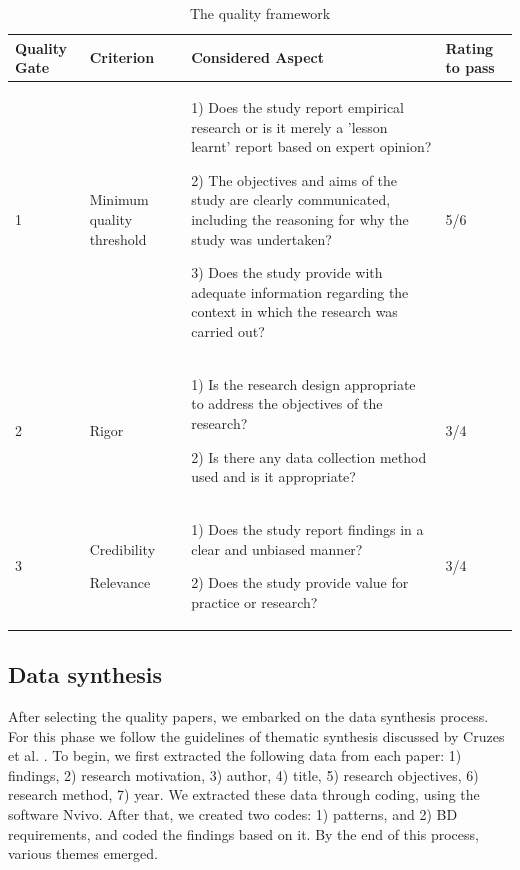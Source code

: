 \documentclass[a4paper,11pt,article,oneside]{memoir}
\begin{document}
\begin{table}
    \renewcommand{\arraystretch}{1}
    \caption[]{The quality framework}
    \begin{tabular}{|p{1cm}|p{2cm}|p{10cm}|p{1.5cm}|}
        \hline
        Quality Gate & Criterion & Considered Aspect & Rating to pass \\ 

        \hline

        1 & Minimum quality threshold & 
        
        1) Does the study report empirical research or is it merely a 'lesson learnt' report based on expert opinion?

        2) The objectives and aims of the study are clearly communicated, including the reasoning for why the study was undertaken?

        3) Does the study provide with adequate information regarding the context in which the research was carried out?
        & 5/6 \\ 
        \hline
        2 & Rigor & 
        
        1) Is the research design appropriate to address the objectives of the research?

        2) Is there any data collection method used and is it appropriate?
        & 3/4 \\ 
        \hline  
        3 &
         Credibility 

         Relevance 
        & 
        1) Does the study report findings in a clear and unbiased manner?

        2) Does the study provide value for practice or research?
        & 
        3/4 \\ 
        \hline   
    \end{tabular}
    \label{qualityFramework}
\end{table}

\subsection{Data synthesis}

After selecting the quality papers, we embarked on the data synthesis process. For this phase we follow the guidelines of thematic synthesis discussed by Cruzes et al. \citet{Cruzes.2011}. To begin, we first extracted the following data from each paper: 1) findings, 2) research motivation, 3) author, 4) title, 5) research objectives, 6) research method, 7) year. We extracted these data through coding, using the software Nvivo. After that, we created two codes: 1) patterns, and 2) BD requirements, and coded the findings based on it. By the end of this process, various themes emerged. 
\end{document}
